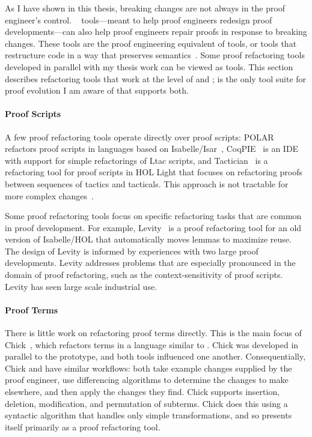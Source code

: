 As I have shown in this thesis, breaking changes are not always in the proof engineer's control.
~\cite{WhitesidePhD} tools---meant to help proof engineers redesign proof developments---can also help proof engineers
repair proofs in response to breaking changes.
These tools are the proof engineering equivalent of  tools, or tools
that restructure code in a way that preserves semantics~\cite{opdyke1992}.
Some proof refactoring tools developed in parallel with my thesis work can be viewed as  tools.
This section describes refactoring tools that work at the level of  and ;
\sysnamelong is the only tool suite for proof evolution I am aware of that supports both.

\paragraph{Proof Scripts}
A few proof refactoring tools operate directly over proof scripts:
\textsc{POLAR}~\cite{Dietrich2013} refactors proof scripts in languages based on Isabelle/Isar~\cite{Wenzel2007isar},
CoqPIE~\cite{Roe2016} is an IDE with support for simple refactorings of Ltac scripts, and
Tactician~\cite{adams2015} is a refactoring tool for proof scripts in HOL Light
that focuses on refactoring proofs between sequences of tactics and tacticals.
This approach is not tractable for more complex changes~\cite{robert2018}.

Some proof refactoring tools focus on specific refactoring tasks that are common in proof development.
For example, Levity~\cite{Bourke12} is a proof refactoring tool for an old version of Isabelle/HOL that automatically
moves lemmas to maximize reuse. The design of Levity is informed by experiences with two large proof developments.
Levity addresses problems that are especially pronounced in the domain of proof refactoring, such as the
context-sensitivity of proof scripts. Levity has seen large scale industrial use.
 
\paragraph{Proof Terms}
There is little work on refactoring proof terms directly. This is the main focus of Chick~\cite{robert2018}, 
which refactors terms in a language similar to .
Chick was developed in parallel to the \sysname prototype, and both tools influenced one another.
Consequentially, Chick and \sysnamelong have similar workflows:
both take example changes supplied by the proof engineer,
use differencing algorithms to determine the changes to make elsewhere,
and then apply the changes they find. 
Chick supports insertion, deletion, modification, and permutation of subterms.
Chick does this using a syntactic algorithm that handles only simple transformations,
and so presents itself primarily as a proof refactoring tool.

